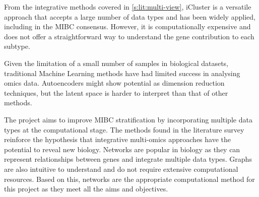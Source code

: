 From the integrative methods covered in \cref{s:lit:multi-view}, iCluster \citep{Shen2012-yj} is a versatile approach that accepts a large number of data types and has been widely applied, including in the MIBC consensus. However, it is computationally expensive and does not offer a straightforward way to understand the gene contribution to each subtype.

Given the limitation of a small number of samples in biological datasets, traditional Machine Learning methods have had limited success in analysing omics data. Autoencoders might show potential as dimension reduction techniques, but the latent space is harder to interpret than that of other methods.

The project aims to improve MIBC stratification by incorporating multiple data types at the computational stage. The methods found in the literature survey reinforce the hypothesis that integrative multi-omics approaches have the potential to reveal new biology. Networks are popular in biology as they can represent relationships between genes and integrate multiple data types. Graphs are also intuitive to understand and do not require extensive computational resources. Based on this, networks are the appropriate computational method for this project as they meet all the aims and objectives.